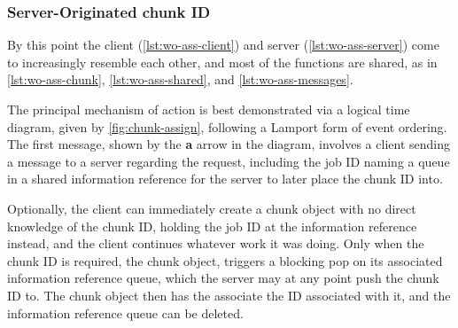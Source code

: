
\subsubsection{Server-Originated chunk ID}

By this point the client (\cref{lst:wo-ass-client}) and server (\cref{lst:wo-ass-server}) come to increasingly resemble each other, and most of the functions are shared, as in \cref{lst:wo-ass-chunk}, \cref{lst:wo-ass-shared}, and \cref{lst:wo-ass-messages}.


The principal mechanism of action is best demonstrated via a logical time diagram, given by \cref{fig:chunk-assign}, following a Lamport form of event ordering\cite{lamport1978ordering}.
The first message, shown by the \textbf{a} arrow in the diagram, involves a client sending a message to a server regarding the request, including the job ID naming a queue in a shared information reference for the server to later place the chunk ID into.

Optionally, the client can immediately create a chunk object with no direct knowledge of the chunk ID, holding the job ID at the information reference instead, and the client continues whatever work it was doing.
Only when the chunk ID is required, the chunk object, triggers a blocking pop on its associated information reference queue, which the server may at any point push the chunk ID to.
The chunk object then has the associate the ID associated with it, and the information reference queue can be deleted.


